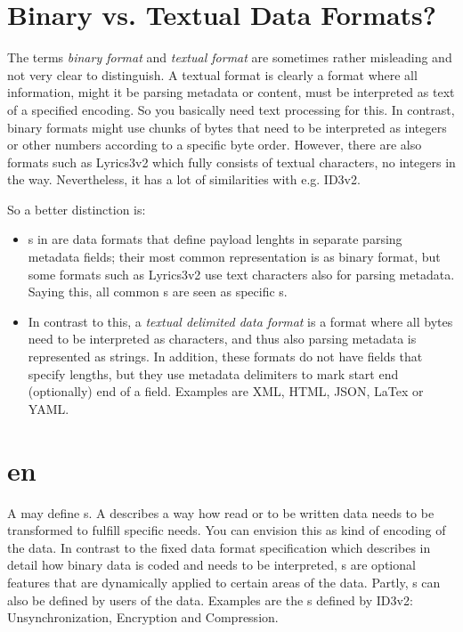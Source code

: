 \section{Binary vs. Textual Data Formats?}
\label{sec:BinDataFormats}

The terms \emph{binary format} and \emph{textual format} are sometimes rather misleading and not very clear to distinguish. A textual format is clearly a format where all information, might it be parsing metadata or content, must be interpreted as text of a specified encoding. So you basically need text processing for this. In contrast, binary formats might use chunks of bytes that need to be interpreted as integers or other numbers according to a specific byte order. However, there are also formats such as Lyrics3v2 which fully consists of textual characters, no integers in the way. Nevertheless, it has a lot of similarities with e.g. ID3v2.

So a better distinction is:
\begin{itemize}
\item \TERMcontainerFormat{}s in \LibName{} are data formats that define payload lenghts in separate parsing metadata fields; their most common representation is as binary format, but some formats such as Lyrics3v2 use text characters also for parsing metadata. Saying this, all common \TERMmetadataFormat{}s are seen as specific \TERMcontainerFormat{}s.
\item In contrast to this, a \emph{textual delimited data format} is a format where all bytes need to be interpreted as characters, and thus also parsing metadata is represented as strings. In addition, these formats do not have fields that specify lengths, but they use metadata delimiters to mark start end (optionally) end of a field. Examples are XML, HTML, JSON, LaTex or YAML.
\end{itemize}


\section{\TERMtransformation{}en}
\label{sec:DataTransformations}

A \TERMdataFormat{} may define \TERMtransformation{}s. A \TERMtransformation{} describes a way how read or to be written data needs to be transformed to fulfill specific needs. You can envision this as kind of encoding of the data. In contrast to the fixed data format specification which describes in detail how binary data is coded and needs to be interpreted, \TERMtransformation{}s are optional features that are dynamically applied to certain areas of the data. Partly, \TERMtransformation{}s can also be defined by users of the data. Examples are the \TERMtransformation{}s defined by ID3v2: Unsynchronization, Encryption and Compression.

